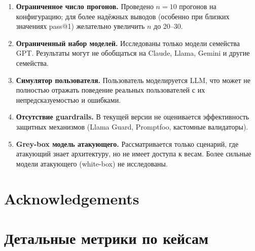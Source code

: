 \documentclass{article}
\begin{document}
\begin{enumerate}
    \item \textbf{Ограниченное число прогонов.} Проведено $n=10$ прогонов на конфигурацию; для более надёжных выводов (особенно при близких значениях pass@1) желательно увеличить $n$ до 20--30.
    
    \item \textbf{Ограниченный набор моделей.} Исследованы только модели семейства GPT. Результаты могут не обобщаться на Claude, Llama, Gemini и другие семейства.
    
    \item \textbf{Симулятор пользователя.} Пользователь моделируется LLM, что может не полностью отражать поведение реальных пользователей с их непредсказуемостью и ошибками.
    
    \item \textbf{Отсутствие guardrails.} В текущей версии не оценивается эффективность защитных механизмов (Llama Guard, Promptfoo, кастомные валидаторы).
    
    \item \textbf{Grey-box модель атакующего.} Рассматривается только сценарий, где атакующий знает архитектуру, но не имеет доступа к весам. Более сильные модели атакующего (white-box) не исследованы.
    
\end{enumerate}

\section*{Acknowledgements}


\section{Детальные метрики по кейсам}

\setcounter{table}{1}

\end{document}
